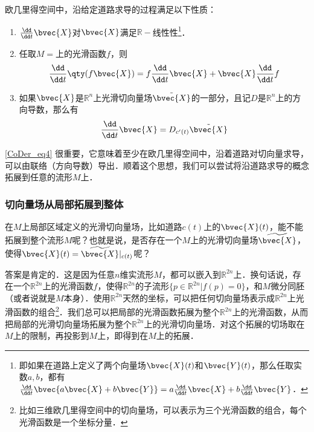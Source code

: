 欧几里得空间中，沿给定道路求导的过程满足以下性质：
\begin{enumerate}
\item $\frac{\dd }{\dd t}\bvec{X}$对$\bvec{X}$满足$\mathbb{R}-$线性性\footnote{即如果在道路上定义了两个向量场$\bvec{X}(t)$和$\bvec{Y}(t)$，那么任取实数$a, b$，都有$\frac{\dd}{\dd t}\bvec{a\bvec{X}+b\bvec{Y}}=a\frac{\dd}{\dd t}\bvec{X}+b\frac{\dd}{\dd t}\bvec{Y}$．}．
\item 任取$M=$上的光滑函数$f$，则
\begin{equation}
\frac{\dd}{\dd t}\qty(f\bvec{X})=f\frac{\dd}{\dd t}\bvec{X}+\bvec{X}\frac{\dd}{\dd t}f
\end{equation}
\item 如果$\bvec{X}$是$\mathbb{R}^n$上光滑切向量场$\tilde{\bvec{X}}$的一部分，且记$D$是$\mathbb{R}^n$上的方向导数，那么有
\begin{equation}\label{CoDer_eq4}
\frac{\dd}{\dd t}\bvec{X}=D_{c'(t)}\tilde{\bvec{X}}
\end{equation}

\end{enumerate}

\autoref{CoDer_eq4} 很重要，它意味着至少在欧几里得空间中，沿着道路对切向量求导，可以由联络（方向导数）导出．顺着这个思想，我们可以尝试将沿道路求导的概念拓展到任意的流形$M$上． 

\subsubsection{切向量场从局部拓展到整体}

在$M$上局部区域定义的光滑切向量场，比如道路$c(t)$上的$\bvec{X}(t)$，能不能拓展到整个流形$M$呢？也就是说，是否存在一个$M$上的光滑切向量场$\widetilde{\bvec{X}}$，使得$\bvec{X}(t)=\widetilde{\bvec{X}}|_{c(t)}$呢？

答案是肯定的．这是因为任意$n$维实流形$M$，都可以嵌入到$\mathbb{R}^{2n}$上．换句话说，存在一个$\mathbb{R}^{2n}$上的光滑函数$f$，使得$\mathbb{R}^{2n}$的子流形$\{p\in\mathbb{R}^{2n}|f(p)=0\}$，和$M$微分同胚（或者说就是$M$本身）．使用$\mathbb{R}^{2n}$天然的坐标，可以把任何切向量场表示成$\mathbb{R}^{2n}$上光滑函数的组合\footnote{比如三维欧几里得空间中的切向量场，可以表示为三个光滑函数的组合，每个光滑函数是一个坐标分量．}．我们总可以把局部的光滑函数拓展为整个$\mathbb{R}^{2n}$上的光滑函数，从而把局部的光滑切向量场拓展为整个$\mathbb{R}^{2n}$上的光滑切向量场．对这个拓展的切场取在$M$上的限制，再投影到$M$上，即得到在$M$上的拓展．

